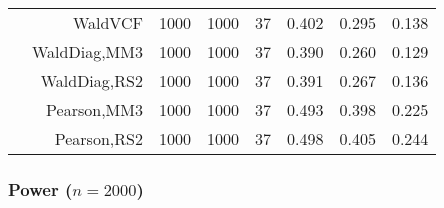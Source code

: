 \documentclass[
]{article}
\begin{document}
\begin{table}[H]
{\begin{tabular}[t]{lrrrrrrr}
\hspace{1em} & WaldVCF & 1000 & 1000 & 37 & 0.402 & 0.295 & 0.138\\

\hspace{1em} & WaldDiag,MM3 & 1000 & 1000 & 37 & 0.390 & 0.260 & 0.129\\

\hspace{1em} & WaldDiag,RS2 & 1000 & 1000 & 37 & 0.391 & 0.267 & 0.136\\

\hspace{1em} & Pearson,MM3 & 1000 & 1000 & 37 & 0.493 & 0.398 & 0.225\\

\hspace{1em} & Pearson,RS2 & 1000 & 1000 & 37 & 0.498 & 0.405 & 0.244\\
\bottomrule
\end{tabular}}
\endgroup{}
\end{table}

\hypertarget{power-n2000}{%
\subsubsection{\texorpdfstring{Power
(\(n=2000\))}{Power (n=2000)}}\label{power-n2000}}
\end{document}
